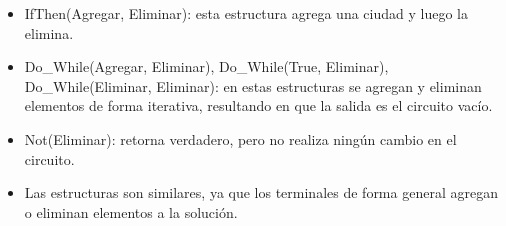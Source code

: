 \begin{itemize}
	\item IfThen(Agregar, Eliminar): esta estructura agrega una ciudad y luego la elimina.
	\item Do\_While(Agregar, Eliminar), Do\_While(True, Eliminar), Do\_While(Eliminar, Eliminar): en estas estructuras se agregan y eliminan elementos de forma iterativa, resultando en que la salida es el circuito vacío.
	\item Not(Eliminar): retorna verdadero, pero no realiza ningún cambio en el circuito.
	\item Las estructuras son similares, ya que los terminales de forma general agregan o eliminan elementos a la solución.
\end{itemize}
